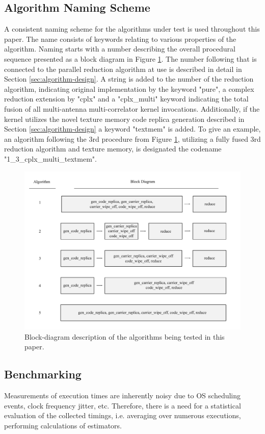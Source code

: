 \documentclass{juliacon}
\begin{document}
\subsection*{Algorithm Naming Scheme}
A consistent naming scheme for the algorithms under test is used throughout this paper. The name consists of keywords relating to various properties of the algorithm. Naming starts with a number describing the overall procedural sequence presented as a block diagram in Figure \ref{fig:algorithms}. The number following that is connected to the parallel reduction algorithm at use is described in detail in Section \ref{sec:algorithm-design}. A string is added to the number of the reduction algorithm, indicating original implementation by the keyword "pure", a complex reduction extension by "cplx" and a "cplx\_multi" keyword indicating the total fusion of all multi-antenna multi-correlator kernel invocations. Additionally, if the kernel utilizes the novel texture memory code replica generation described in Section \ref{sec:algorithm-design} a keyword "textmem" is added. To give an example, an algorithm following the 3rd procedure from Figure \ref{fig:algorithms}, utilizing a fully fused 3rd reduction algorithm and texture memory, is designated the codename "1\_3\_cplx\_multi\_textmem". 
\begin{figure}[h]
    \centering
    \includegraphics[scale=0.8]{algorithms.pdf}
    
    \caption{\label{fig:algorithms} Block-diagram description of the algorithms being tested in this paper.}
\end{figure}

\subsection*{Benchmarking}
Measurements of execution times are inherently noisy due to OS scheduling events, clock frequency jitter, etc. Therefore, there is a need for a statistical evaluation of the collected timings, i.e. averaging over numerous executions, performing calculations of estimators.
\end{document}

